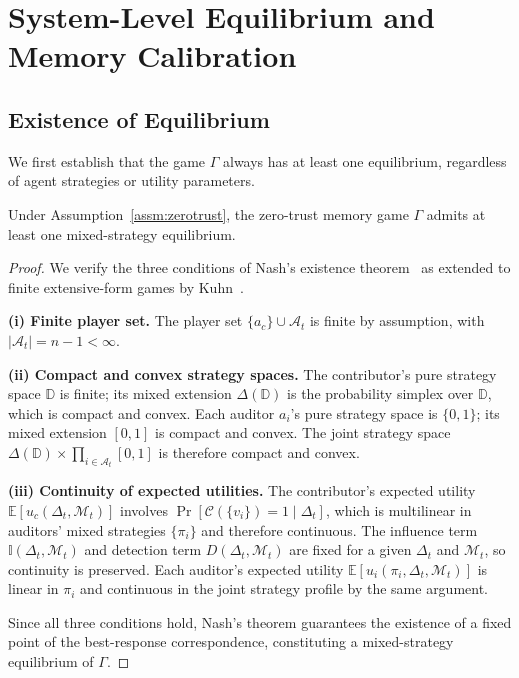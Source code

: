 \section{System-Level Equilibrium and Memory Calibration}
\label{app:equilibrium}

\subsection{Existence of Equilibrium}
\label{app:nash_existence}

We first establish that the game $\Gamma$ always has at least one
equilibrium, regardless of agent strategies or utility parameters.

\begin{proposition}
\label{prop:nash_existence}
Under Assumption~\ref{assm:zerotrust}, the zero-trust memory game
$\Gamma$ admits at least one mixed-strategy equilibrium.
\end{proposition}

\begin{proof}
We verify the three conditions of Nash's existence
theorem~\citep{nash1950equilibrium} as extended to finite extensive-form
games by Kuhn~\citep{kuhn1953extensive}.

\textbf{(i) Finite player set.}
The player set $\{a_c\} \cup \mathcal{A}_t$ is finite by assumption,
with $|\mathcal{A}_t| = n-1 < \infty$.

\textbf{(ii) Compact and convex strategy spaces.}
The contributor's pure strategy space $\mathbb{D}$ is finite; its mixed
extension $\Delta(\mathbb{D})$ is the probability simplex over
$\mathbb{D}$, which is compact and convex. Each auditor $a_i$'s pure
strategy space is $\{0,1\}$; its mixed extension $[0,1]$ is compact and
convex. The joint strategy space $\Delta(\mathbb{D}) \times
\prod_{i \in \mathcal{A}_t}[0,1]$ is therefore compact and convex.

\textbf{(iii) Continuity of expected utilities.}
The contributor's expected utility $\mathbb{E}[u_c(\Delta_t,
\mathcal{M}_t)]$ involves $\Pr[\mathcal{C}(\{v_i\})=1 \mid \Delta_t]$,
which is multilinear in auditors' mixed strategies $\{\pi_i\}$ and
therefore continuous. The influence term $\mathbb{I}(\Delta_t,
\mathcal{M}_t)$ and detection term $D(\Delta_t, \mathcal{M}_t)$ are
fixed for a given $\Delta_t$ and $\mathcal{M}_t$, so continuity is
preserved. Each auditor's expected utility $\mathbb{E}[u_i(\pi_i,
\Delta_t, \mathcal{M}_t)]$ is linear in $\pi_i$ and continuous in
the joint strategy profile by the same argument.

Since all three conditions hold, Nash's theorem guarantees the existence
of a fixed point of the best-response correspondence, constituting a
mixed-strategy equilibrium of $\Gamma$.
\end{proof}

